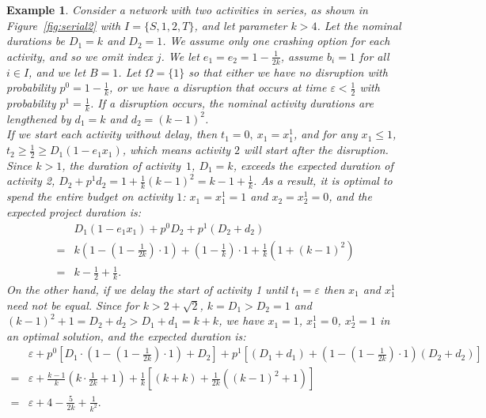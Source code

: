 \documentclass[11pt]{article}
\newtheorem{example}{Example}
\begin{document}
	\begin{example} \label{eg:delay}
		Consider a network with two activities in series, as shown in Figure~\ref{fig:serial2} with $I=\{S,1,2,T\}$, and let parameter \(k > 4\). Let the nominal durations be $D_1 = k$ and $D_2 = 1$. We assume only one crashing option for each activity, and so we omit index $j$. We let $e_1=e_2=1 - \frac{1}{2k}$, assume $b_i=1$ for all $i \in I$, and we let $B=1$. Let $\Omega=\{1\}$ so that either we have no disruption with probability $p^0=1 - \frac{1}{k}$, or we have a disruption that occurs at time $\varepsilon < \frac{1}{2}$ with probability $p^1=\frac{1}{k}$. If a disruption occurs, the nominal activity durations are lengthened by $d_1 = k$ and $d_2 = (k - 1)^2$. \\
		\newline
		If we start each activity without delay, then \(t_1 = 0,\ x_1=x_1^1\), and for any \(x_1 \leq 1\), \(t_2 \geq \frac{1}{2} \geq D_1(1 - e_1 x_1) \), which means activity \(2\) will start after the disruption. Since \(k > 1\), the duration of activity~\(1\), $D_1 = k$, exceeds the expected duration of activity 2, $ D_2 + p^1 d_2 = 1 + \frac{1}{k} (k-1)^2 = k - 1 + \frac{1}{k}$. As a result, it is optimal to spend the entire budget on activity \(1\): $x_1=x_1^1=1$ and $x_2=x_2^1=0$, and the expected project duration is: 
		\begin{align*}
		&D_1 (1 - e_1 x_1) + p^0 D_2 + p^1 (D_2 + d_2) \\
		= & k \left(1 - \left (1 - \frac{1}{2k} \right )\cdot 1 \right) + (1 - \frac{1}{k}) \cdot 1 + \frac{1}{k} \left(1 + (k -1)^2\right) \\
		= & k - \frac{1}{2} + \frac{1}{k}.
		\end{align*}
		On the other hand, if we delay the start of activity 1 until $t_1= \varepsilon$ then $x_1$ and $x_1^1$ need not be equal. Since for \(k > 2 + \sqrt{2}\), $k = D_1 > D_2 = 1$ and $(k - 1)^2 + 1 = D_2+d_2 > D_1 + d_1 = k + k$, we have $x_1=1$, $x_1^1=0$, $x_2^1=1$ in an optimal solution, and the expected duration is:
		\begin{align*}
		&\varepsilon + p^0 \left[D_1 \cdot \left(1 - (1 - \frac{1}{2k}) \cdot 1 \right) + D_2 \right]  + p^1 \left[(D_1 + d_1) + \left(1 - (1 - \frac{1}{2k}) \cdot 1 \right) (D_2 + d_2) \right]\\
		= & \varepsilon + \frac{k - 1}{k} \left(k \cdot \frac{1}{2k} + 1\right) + \frac{1}{k} \left[ (k + k) + \frac{1}{2k} \left((k-1)^2 + 1\right) \right] \\
		= & \varepsilon + 4 - \frac{5}{2k} + \frac{1}{k^2}.
		\end{align*}
	\end{example}
\end{document}
